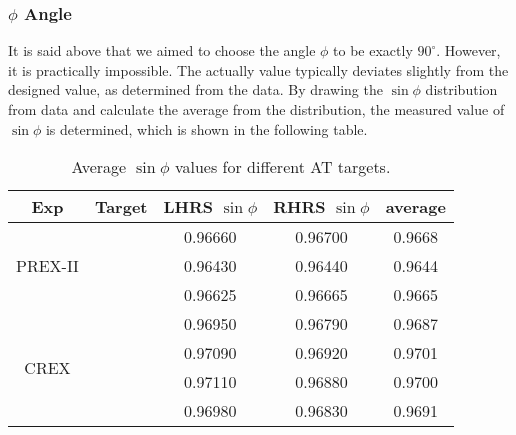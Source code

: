 \subsubsection{$\phi$ Angle}
It is said above that we aimed to choose the angle $\phi$ to be exactly $90^\circ$.
However, it is practically impossible. The actually value typically deviates slightly from
the designed value, as determined from the data. By drawing the $\sin\phi$ distribution
from data and calculate the average from the distribution, the measured value of $\sin\phi$ 
is determined, which is shown in the following table.
\begin{table}[!htbp]
    \centering
    \begin{tabular}{c c | c c c}
	\hline
	Exp & Target	& LHRS $\sin\phi$   & RHRS $\sin\phi$	& average   \\
	\hline
	\multirow{3}{*}{PREX-II}
	    & \Carbon    & 0.96660   & 0.96700	& 0.9668    \\ 
	    & \ca   & 0.96430   & 0.96440	& 0.9644    \\ 
	    & \Pb   & 0.96625   & 0.96665	& 0.9665    \\ 
	\hline
	\multirow{4}{*}{CREX}
	    & \Carbon    & 0.96950   & 0.96790	& 0.9687    \\ 
	    & \ca   & 0.97090   & 0.96920	& 0.9701    \\ 
	    & \Ca   & 0.97110   & 0.96880	& 0.9700    \\ 
	    & \Pb   & 0.96980   & 0.96830	& 0.9691    \\ 
	\hline
    \end{tabular}
    \caption{Average $\sin\phi$ values for different AT targets.}
\end{table}

